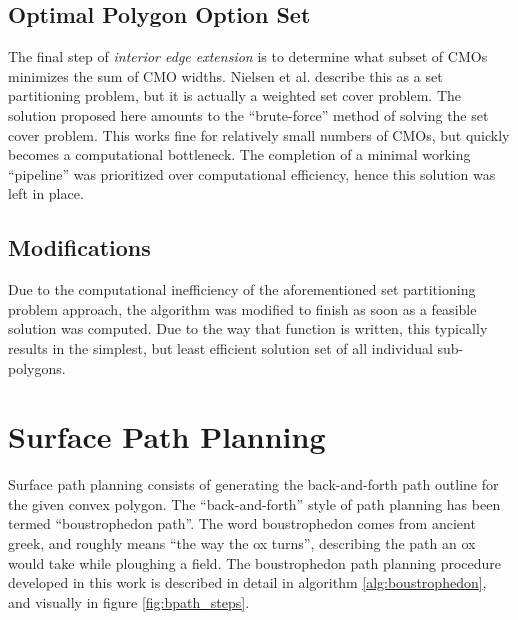 \subsection{Optimal Polygon Option Set}\label{OptimalCMOs}
The final step of \textit{interior edge extension} is to determine what subset of CMOs minimizes the sum of CMO widths.
Nielsen et al. describe this as a set partitioning problem\cite{IntEdgeExt}, but it is actually a weighted set cover problem.
The solution proposed here amounts to the ``brute-force'' method of solving the set cover problem.
This works fine for relatively small numbers of CMOs, but quickly becomes a computational bottleneck.
The completion of a minimal working ``pipeline'' was prioritized over computational efficiency, hence this solution was left in place.

\subsection{Modifications}
Due to the computational inefficiency of the aforementioned set partitioning problem approach, the algorithm was modified to finish as soon as a feasible solution was computed.
Due to the way that function is written, this typically results in the simplest, but least efficient solution set of all individual sub-polygons.

\section{Surface Path Planning}
Surface path planning consists of generating the back-and-forth path outline for the given convex polygon.
The ``back-and-forth'' style of path planning has been termed ``boustrophedon path''.
The word boustrophedon comes from ancient greek, and roughly means ``the way the ox turns'', describing the path an ox would take while ploughing a field.
The boustrophedon path planning procedure developed in this work is described in detail in algorithm \ref{alg:boustrophedon}, and visually in figure \ref{fig:bpath_steps}.

